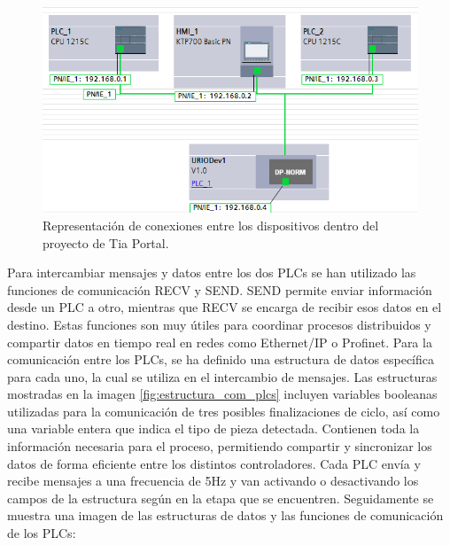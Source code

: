 \begin{figure} [h!]
  \begin{center}
    \includegraphics[width=15cm]{figs/conexiones_tiaportal}
  \end{center}
  \caption{\centering Representación de conexiones entre los dispositivos dentro del proyecto de Tia Portal.}
  \label{fig:conexiones_tiaportal}
\end{figure} 

\clearpage

Para intercambiar mensajes y datos entre los dos PLCs se han utilizado las funciones de comunicación RECV y SEND. SEND permite enviar información desde un PLC a otro, mientras que RECV se encarga de recibir esos datos en el destino. Estas funciones son muy útiles para coordinar procesos distribuidos y compartir datos en tiempo real en redes como Ethernet/IP o Profinet. Para la comunicación entre los PLCs, se ha definido una estructura de datos específica para cada uno, la cual se utiliza en el intercambio de mensajes. Las estructuras mostradas en la imagen \ref{fig:estructura_com_plcs} incluyen variables booleanas utilizadas para la comunicación de tres posibles finalizaciones de ciclo, así como una variable entera que indica el tipo de pieza detectada. Contienen toda la información necesaria para el proceso, permitiendo compartir y sincronizar los datos de forma eficiente entre los distintos controladores. Cada PLC envía y recibe mensajes a una frecuencia de 5Hz y van activando o desactivando los campos de la estructura según en la etapa que se encuentren. Seguidamente se muestra una imagen de las estructuras de datos y las funciones de comunicación de los PLCs: \\

